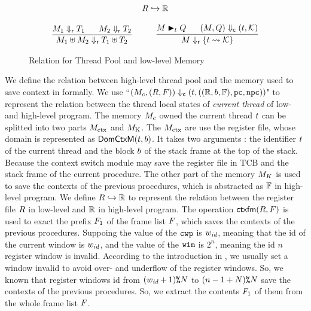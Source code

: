\begin{figure}[!t]
\[\begin{array}{c}
{\begin{array}{c}
                    \Rinj{\RFile}{\hRfile} 
                \end{array}
            } \\
            \\
            \infer
            {
                \rdyStRel{\Mem_1 \uplus \Mem_2}{\thrdpool_1 \uplus \thrdpool_2}
            }
            {
                \rdyStRel{\Mem_1}{\thrdpool_1} \quad \ \ 
                \rdyStRel{\Mem_2}{\thrdpool_2}
            } \qquad \quad
            \infer
            {
                \rdyStRel{\Mem}{\{ \thrdid \rightsquigarrow \hthrdlocalst \}}
            }
            {
                \restoreCtx{\Mem}{\thrdid}{\Rstate} \quad \ \ 
                \curStRel{(\Mem, \Rstate)}{(\thrdid, \hthrdlocalst)}
            }
        \end{array}
    \]
    \caption{Relation for Thread Pool and low-level Memory}
    \label{fig:rel-thrdpool-mem}
    \vspace{-1em}
\end{figure}

We define the relation between high-level thread pool and 
the memory used to save context in \Fig{\ref{fig:rel-thrdpool-mem}} formally. We use 
``${(M_c, (R, F))} \Downarrow_{\textsf{c}} {(t, ((\mathbb{R}, b, \mathbb{F}), \texttt{pc}, \texttt{npc}))}$" 
to represent the relation between the thread local states of 
{\it current thread} of low- and high-level program. 
The memory $M_c$ owned the current thread $t$ can be 
splitted into two parts $M_{\text{ctx}}$ and $M_{\text{K}}$. The 
$M_{\text{ctx}}$ are use the register file, whose domain is represented as 
$\textsf{DomCtxM}{(t, b)}$. It takes two arguments : the identifier $t$ 
of the current thread and the block $b$ of the stack frame at the top of the stack. 
Because the context switch module may save the register file in TCB and 
the stack frame of the current procedure. The other part of the memory $M_K$ 
is used to save the contexts of the previous procedures, which is abstracted 
as $\mathbb{F}$ in high-level program. We define ${R}\hookrightarrow{\mathbb{R}}$ to 
represent the relation between the register file $R$ in low-level and 
$\mathbb{R}$ in high-level program. The operation $\textsf{ctxfm}(R, F)$ is 
used to exact the prefix $F_1$ of the frame list $F$, which saves 
the contexts of the previous procedures. Suppoing the value of the $\texttt{cwp}$ 
is $w_{\textit{id}}$, meaning that the id of the current window is $w_{\textit{id}}$, 
and the value of the $\texttt{wim}$ is $2^n$, meaning the id $n$ register window 
is invalid. According to the introduction in \Fig{\ref{subsec:syntax}}, 
we usually set a window invalid to avoid over- and underflow of the 
register windows. So, we known that register windows id from $(w_{\textit{id}} + 1)\texttt{\%}{N}$ 
to $(n - 1 + N)\texttt{\%}{N}$ save the contexts of the previous procedures. 
So, we extract the contents $F_1$ of them from the whole frame list $F$. 

